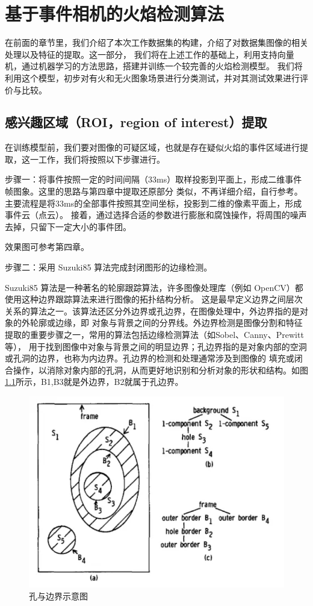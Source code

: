
\chapter{基于事件相机的火焰检测算法}
在前面的章节里，我们介绍了本次工作数据集的构建，介绍了对数据集图像的相关处理以及特征的提取。这一部分，
我们将在上述工作的基础上，利用支持向量机，通过机器学习的方法思路，搭建并训练一个较完善的火焰检测模型。
我们将利用这个模型，初步对有火和无火图象场景进行分类测试，并对其测试效果进行评价与比较。

\section{感兴趣区域（ROI，region of interest）提取}
在训练模型前，我们要对图像的可疑区域，也就是存在疑似火焰的事件区域进行提取，这一工作，我们将按照以下步骤进行。

步骤一：将事件按照一定的时间间隔（33ms）取样投影到平面上，形成二维事件帧图象。这里的思路与第四章中提取还原部分
类似，不再详细介绍，自行参考。主要流程是将33ms的全部事件按照其空间坐标，投影到二维的像素平面上，形成事件云（点云）。
接着，通过选择合适的参数进行膨胀和腐蚀操作，将周围的噪声去掉，只留下一定大小的事件团。

效果图可参考第四章。

步骤二：采用 Suzuki85 算法完成封闭图形的边缘检测。

Suzuki85 算法是一种著名的轮廓跟踪算法\cite{suzuki1985topological}，许多图像处理库（例如 OpenCV）都使用这种边界跟踪算法来进行图像的拓扑结构分析。
这是最早定义边界之间层次关系的算法之一。该算法还区分外边界或孔边界，在图像处理中，外边界指的是对象的外轮廓或边缘，即
对象与背景之间的分界线。外边界检测是图像分割和特征提取的重要步骤之一，常用的算法包括边缘检测算法（如Sobel、Canny、Prewitt等），
用于找到图像中对象与背景之间的明显边界；孔边界指的是对象内部的空洞或孔洞的边界，也称为内边界。孔边界的检测和处理通常涉及到图像的
填充或闭合操作，以消除对象内部的孔洞，从而更好地识别和分析对象的形状和结构。如图\ref{17}所示，B1,B3就是外边界，B2就属于孔边界。
\begin{figure}[ht]
    \centering
    \includegraphics[width=\textwidth]{figures/algorithm_boundary.png}
    \caption{孔与边界示意图}
    \label{17}
\end{figure}


